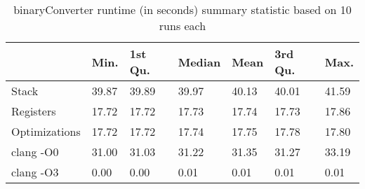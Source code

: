 \begin{table}[h!]
\centering
\begin{tabular}{p{}p{}p{}p{}p{}p{}p{}}
  \hline
 & Min. & 1st Qu. & Median & Mean & 3rd Qu. & Max. \\ 
  \hline
Stack & 39.87 & 39.89 & 39.97 & 40.13 & 40.01 & 41.59 \\ 
  Registers & 17.72 & 17.72 & 17.73 & 17.74 & 17.73 & 17.86 \\ 
  Optimizations & 17.72 & 17.72 & 17.74 & 17.75 & 17.78 & 17.80 \\ 
  clang -O0 & 31.00 & 31.03 & 31.22 & 31.35 & 31.27 & 33.19 \\ 
  clang -O3 & 0.00 & 0.00 & 0.01 & 0.01 & 0.01 & 0.01 \\ 
   \hline
\end{tabular}
\caption{binaryConverter runtime (in seconds) summary statistic based on 10 runs each}
\end{table}

